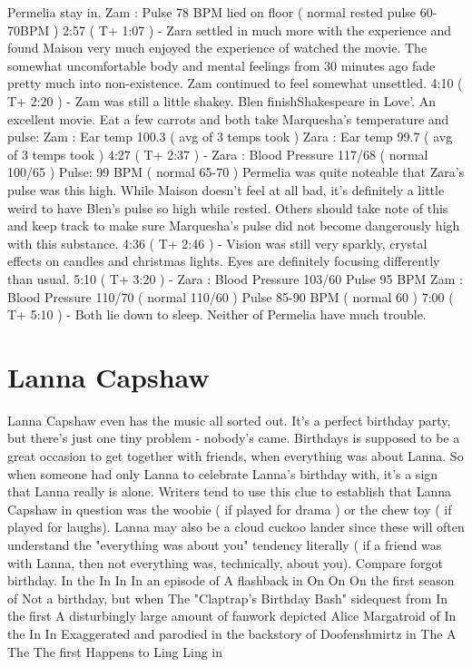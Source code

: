 \documentclass[12pt]{book}
\begin{document}
Permelia stay in. Zam : Pulse 78 BPM lied on floor ( normal rested pulse 60-70BPM ) 2:57 ( T+ 1:07 ) - Zara settled in much more with the experience and found Maison very much enjoyed the experience of watched the movie. The somewhat uncomfortable body and mental feelings from 30 minutes ago fade pretty much into non-existence. Zam continued to feel somewhat unsettled. 4:10 ( T+ 2:20 ) - Zam was still a little shakey. Blen finishShakespeare in Love'. An excellent movie. Eat a few carrots and both take Marquesha's temperature and pulse: Zam : Ear temp 100.3 ( avg of 3 temps took ) Zara : Ear temp 99.7 ( avg of 3 temps took ) 4:27 ( T+ 2:37 ) - Zara : Blood Pressure 117/68 ( normal 100/65 ) Pulse: 99 BPM ( normal 65-70 ) Permelia was quite noteable that Zara's pulse was this high. While Maison doesn't feel at all bad, it's definitely a little weird to have Blen's pulse so high while rested. Others should take note of this and keep track to make sure Marquesha's pulse did not become dangerously high with this substance. 4:36 ( T+ 2:46 ) - Vision was still very sparkly, crystal effects on candles and christmas lights. Eyes are definitely focusing differently than usual. 5:10 ( T+ 3:20 ) - Zara : Blood Pressure 103/60 Pulse 95 BPM Zam : Blood Pressure 110/70 ( normal 110/60 ) Pulse 85-90 BPM ( normal 60 ) 7:00 ( T+ 5:10 ) - Both lie down to sleep. Neither of Permelia have much trouble.



\chapter{Lanna Capshaw}

Lanna Capshaw even has the music all sorted out. It's a perfect birthday party, but there's just one tiny problem - nobody's came. Birthdays is supposed to be a great occasion to get together with friends, when everything was about Lanna. So when someone had only Lanna to celebrate Lanna's birthday with, it's a sign that Lanna really is alone. Writers tend to use this clue to establish that Lanna Capshaw in question was the woobie ( if played for drama ) or the chew toy ( if played for laughs). Lanna may also be a cloud cuckoo lander since these will often understand the "everything was about you" tendency literally ( if a friend was with Lanna, then not everything was, technically, about you). Compare forgot birthday. In the In In In an episode of A flashback in On On On the first season of Not a birthday, but when The "Claptrap's Birthday Bash" sidequest from In the first A disturbingly large amount of fanwork depicted Alice Margatroid of In the In In Exaggerated and parodied in the backstory of Doofenshmirtz in The A The The first Happens to Ling Ling in
\end{document}
